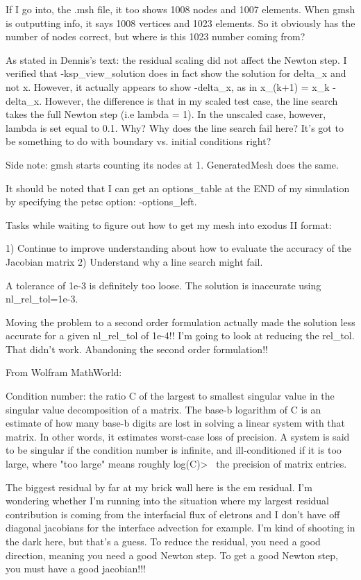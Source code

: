 {If I go into, the .msh file, it too shows 1008 nodes and 1007 elements. When gmsh is outputting info, it says 1008 vertices and 1023 elements. So it obviously has the number of nodes correct, but where is this 1023 number coming from?

As stated in Dennis's text: the residual scaling did not affect the Newton step. I verified that -ksp_view_solution does in fact show the solution for delta_x and not x. However, it actually appears to show -delta_x, as in x_(k+1) = x_k - delta_x. However, the difference is that in my scaled test case, the line search takes the full Newton step (i.e lambda = 1). In the unscaled case, however, lambda is set equal to 0.1. Why? Why does the line search fail here? It's got to be something to do with boundary vs. initial conditions right?

Side note: gmsh starts counting its nodes at 1. GeneratedMesh does the same.

It should be noted that I can get an options_table at the END of my simulation by specifying the petsc option: -options_left.

Tasks while waiting to figure out how to get my mesh into exodus II format:

1) Continue to improve understanding about how to evaluate the accuracy of the Jacobian matrix
2) Understand why a line search might fail.

A tolerance of 1e-3 is definitely too loose. The solution is inaccurate using nl_rel_tol=1e-3.

Moving the problem to a second order formulation actually made the solution less accurate for a given nl_rel_tol of 1e-4!! I'm going to look at reducing the rel_tol. That didn't work. Abandoning the second order formulation!!

From Wolfram MathWorld:

Condition number: the ratio C of the largest to smallest singular value in the singular value decomposition of a matrix. The base-b logarithm of C is an estimate of how many base-b digits are lost in solving a linear system with that matrix. In other words, it estimates worst-case loss of precision. A system is said to be singular if the condition number is infinite, and ill-conditioned if it is too large, where "too large" means roughly log(C)>~ the precision of matrix entries.

The biggest residual by far at my brick wall here is the em residual. I'm wondering whether I'm running into the situation where my largest residual contribution is coming from the interfacial flux of eletrons and I don't have off diagonal jacobians for the interface advection for example. I'm kind of shooting in the dark here, but that's a guess. To reduce the residual, you need a good direction, meaning you need a good Newton step. To get a good Newton step, you must have a good jacobian!!!

}
